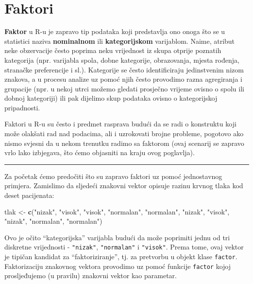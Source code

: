 \documentclass[]{book}
\newenvironment{Shaded}{\begin{snugshade}}{\end{snugshade}}
\newcommand{\KeywordTok}[1]{\textcolor[rgb]{0.13,0.29,0.53}{\textbf{#1}}}
\newcommand{\StringTok}[1]{\textcolor[rgb]{0.31,0.60,0.02}{#1}}
\newcommand{\NormalTok}[1]{#1}
\theoremstyle{definition}
\theoremstyle{definition}
\theoremstyle{definition}
\theoremstyle{remark}
\begin{document}
\section{Faktori}\label{faktori}

\textbf{Faktor} u R-u je zapravo tip podataka koji predstavlja ono onoga
što se u statistici naziva \textbf{nominalnom} ili
\textbf{kategorijskom} varijablom. Naime, atribut neke obzervacije često
poprima neku vrijednost iz skupa otprije poznatih kategorija (npr.
varijabla spola, dobne kategorije, obrazovanja, mjesta rođenja,
stranačke preferencije i sl.). Kategorije se često identificiraju
jedinstvenim nizom znakova, a u procesu analize uz pomoć njih često
provodimo razna agregiranja i grupacije (npr. u nekoj utrci možemo
gledati prosječno vrijeme ovisno o spolu ili dobnoj kategoriji) ili pak
dijelimo skup podataka ovisno o kategorijskoj pripadnosti.

Faktori u R-u su često i predmet rasprava budući da se radi o konstruktu
koji može olakšati rad nad podacima, ali i uzrokovati brojne probleme,
pogotovo ako nismo svjesni da u nekom trenutku radimo sa faktorom (ovaj
scenarij se zapravo vrlo lako izbjegava, što ćemo objasniti na kraju
ovog poglavlja).

\begin{center}\rule{0.5\linewidth}{\linethickness}\end{center}

Za početak ćemo predočiti što su zapravo faktori uz pomoć jednostavnog
primjera. Zamislimo da sljedeći znakovni vektor opisuje razinu krvnog
tlaka kod deset pacijenata:

\begin{Shaded}
\begin{Highlighting}[]
\NormalTok{tlak <-}\StringTok{ }\KeywordTok{c}\NormalTok{(}\StringTok{"nizak"}\NormalTok{, }\StringTok{"visok"}\NormalTok{, }\StringTok{"visok"}\NormalTok{, }\StringTok{"normalan"}\NormalTok{, }\StringTok{"normalan"}\NormalTok{, }
          \StringTok{"nizak"}\NormalTok{, }\StringTok{"visok"}\NormalTok{, }\StringTok{"nizak"}\NormalTok{, }\StringTok{"normalan"}\NormalTok{, }\StringTok{"normalan"}\NormalTok{)}
\end{Highlighting}
\end{Shaded}

Ovo je očito ``kategorijska'' varijabla budući da može poprimiti jednu
od tri diskretne vrijednosti - \texttt{"nizak"}, \texttt{"normalan"} i
\texttt{"visok"}. Prema tome, ovaj vektor je tipičan kandidat za
``faktoriziranje'', tj. za pretvorbu u objekt klase \texttt{factor}.
Faktorizaciju znakovnog vektora provodimo uz pomoć funkcije
\texttt{factor} kojoj prosljeđujemo (u pravilu) znakovni vektor kao
parametar.
\end{document}
